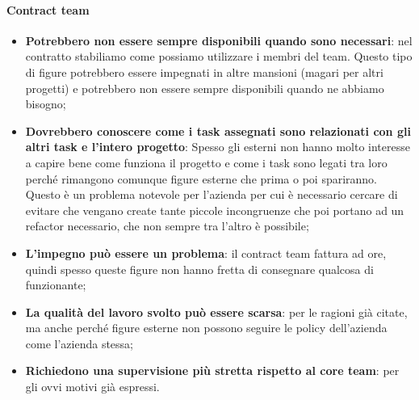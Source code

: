 \paragraph{Contract team}
\begin{itemize}
	\item \textbf{Potrebbero non essere sempre disponibili quando sono necessari}: nel contratto stabiliamo come possiamo utilizzare i membri del team. Questo tipo di figure potrebbero essere impegnati in altre mansioni (magari per altri progetti) e potrebbero non essere sempre disponibili quando ne abbiamo bisogno;
	\item \textbf{Dovrebbero conoscere come i task assegnati sono relazionati con gli altri task e l’intero progetto}: Spesso gli esterni non hanno molto interesse a capire bene come funziona il progetto e come i task sono legati tra loro perché rimangono comunque figure esterne che prima o poi spariranno. Questo è un problema notevole per l'azienda per cui è necessario cercare di evitare che vengano create tante piccole incongruenze che poi portano ad un refactor necessario, che non sempre tra l'altro è possibile;
	\item \textbf{L’impegno può essere un problema}: il contract team fattura ad ore, quindi spesso queste figure non hanno fretta di consegnare qualcosa di funzionante;
	\item \textbf{La qualità del lavoro svolto può essere scarsa}: per le ragioni già citate, ma anche perché figure esterne non possono seguire le policy dell'azienda come l'azienda stessa;
	\item \textbf{Richiedono una supervisione più stretta rispetto al core team}: per gli ovvi motivi già espressi.
\end{itemize}

